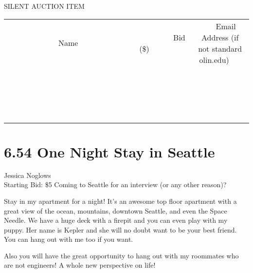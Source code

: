 \documentclass[11pt]{article}
\begin{document}
SILENT AUCTION ITEM
\\[3ex]
\begin{tabular}{c c c}
~~~~~~~~~~~~~Name~~~~~~~~~~~~~ & ~~~~~~~~~Bid (\$)~~~~~~~~~  & ~~~Email Address (if not standard olin.edu)~~~\\
 & & \\
\hline
 & & \\
\hline
 & & \\
\hline
 & & \\
\hline
 & & \\
\hline
 & & \\
\hline
 & & \\
\hline
 & & \\
\hline
 & & \\
\hline
 & & \\
\hline
 & & \\
\hline
 & & \\
\hline
 & & \\
\hline
 & & \\
\hline
 & & \\
\hline
 & & \\
\hline
 & & \\
\hline
 & & \\
\hline
 & & \\
\hline
\end{tabular}
\newpage
\section*{6.54 One Night Stay in Seattle}
Jessica Noglows
\\
Starting Bid: \$5
\newline
Coming to Seattle for an interview (or any other reason)?

Stay in my apartment for a night! It's an awesome top floor apartment with a great view of the ocean, mountains, downtown Seattle, and even the Space Needle.  We have a huge deck with a firepit and you can even play with my puppy.  Her name is Kepler and she will no doubt want to be your best friend.  You can hang out with me too if you want.

Also you will have the great opportunity to hang out with my roommates who are not engineers!  A whole new perspective on life!
\end{document}
